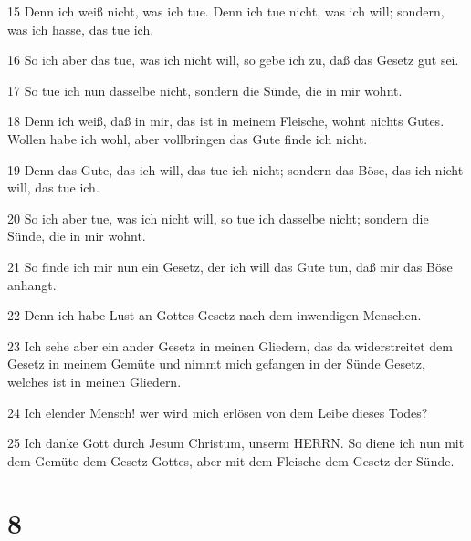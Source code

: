 \par 15 Denn ich weiß nicht, was ich tue. Denn ich tue nicht, was ich will; sondern, was ich hasse, das tue ich.
\par 16 So ich aber das tue, was ich nicht will, so gebe ich zu, daß das Gesetz gut sei.
\par 17 So tue ich nun dasselbe nicht, sondern die Sünde, die in mir wohnt.
\par 18 Denn ich weiß, daß in mir, das ist in meinem Fleische, wohnt nichts Gutes. Wollen habe ich wohl, aber vollbringen das Gute finde ich nicht.
\par 19 Denn das Gute, das ich will, das tue ich nicht; sondern das Böse, das ich nicht will, das tue ich.
\par 20 So ich aber tue, was ich nicht will, so tue ich dasselbe nicht; sondern die Sünde, die in mir wohnt.
\par 21 So finde ich mir nun ein Gesetz, der ich will das Gute tun, daß mir das Böse anhangt.
\par 22 Denn ich habe Lust an Gottes Gesetz nach dem inwendigen Menschen.
\par 23 Ich sehe aber ein ander Gesetz in meinen Gliedern, das da widerstreitet dem Gesetz in meinem Gemüte und nimmt mich gefangen in der Sünde Gesetz, welches ist in meinen Gliedern.
\par 24 Ich elender Mensch! wer wird mich erlösen von dem Leibe dieses Todes?
\par 25 Ich danke Gott durch Jesum Christum, unserm HERRN. So diene ich nun mit dem Gemüte dem Gesetz Gottes, aber mit dem Fleische dem Gesetz der Sünde.

\chapter{8}

